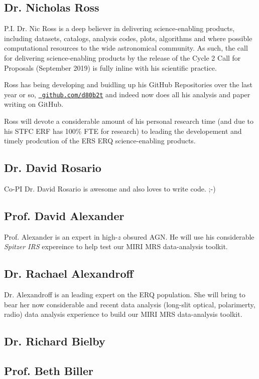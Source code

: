 
\subsection{Dr. Nicholas Ross}
P.I. Dr. Nic Ross is a deep believer in delivering science-enabling
products, including datasets, catalogs, analysis codes, plots,
algorithms and where possible computational resources to the wide
astronomical community.  As such, the call for delivering
science-enabling products by the release of the Cycle 2 Call for
Proposals (September 2019) is fully inline with his scientific
practice.

Ross has being developing and buidling up his GitHub Repositories over
the last year or so, \href{https://github.com/d80b2t}{\tt
github.com/d80b2t} and indeed now does all his analysis and paper
writing on GitHub.

Ross will devote a considerable amount of his personal research time
(and due to his STFC ERF has 100\% FTE for research) to leading the
developement and timely prodcution of the ERS ERQ science-enabling
products.


\subsection{Dr. David Rosario} 
Co-PI Dr. David Rosario is awesome and also loves to write code. ;-) 


\subsection{Prof. David Alexander} 
Prof. Alexander is an expert in high-$z$ obsured AGN.  He will use his
considerable {\it Spitzer IRS} expereince to help test our MIRI MRS
data-analysis toolkit.


\subsection{Dr. Rachael Alexandroff} 
Dr. Alexandroff is an leading expert on the ERQ population.  She will
bring to bear her now considerable and recent data analysis (long-slit
optical, polarimerty, radio) data analysis experience to build our
MIRI MRS data-analysis toolkit.


\subsection{Dr. Richard Bielby}


\subsection{Prof. Beth Biller}


